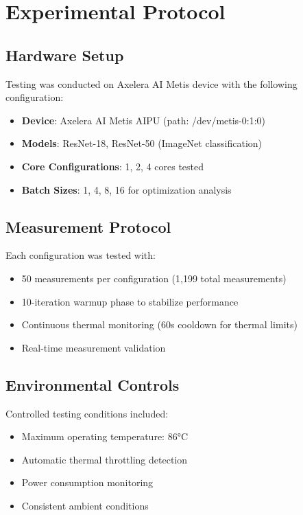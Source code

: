 \documentclass[12pt,draftcls,onecolumn]{IEEEtran}
\begin{document}
\section{Experimental Protocol}

\subsection{Hardware Setup}

Testing was conducted on Axelera AI Metis device with the following configuration:
\begin{itemize}
    \item \textbf{Device}: Axelera AI Metis AIPU (path: /dev/metis-0:1:0)
    \item \textbf{Models}: ResNet-18, ResNet-50 (ImageNet classification)
    \item \textbf{Core Configurations}: 1, 2, 4 cores tested
    \item \textbf{Batch Sizes}: 1, 4, 8, 16 for optimization analysis
\end{itemize}

\subsection{Measurement Protocol}

Each configuration was tested with:
\begin{itemize}
    \item 50 measurements per configuration (1,199 total measurements)
    \item 10-iteration warmup phase to stabilize performance
    \item Continuous thermal monitoring (60s cooldown for thermal limits)
    \item Real-time measurement validation
\end{itemize}

\subsection{Environmental Controls}

Controlled testing conditions included:
\begin{itemize}
    \item Maximum operating temperature: 86°C
    \item Automatic thermal throttling detection
    \item Power consumption monitoring
    \item Consistent ambient conditions
\end{itemize}
\end{document}
